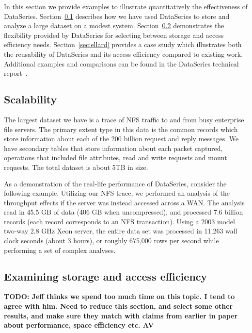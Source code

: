 \documentclass{acm_proc_article-sp}
\begin{document}
In this section we provide examples to illustrate quantitatively the 
effectiveness of DataSeries.  
Section~\ref{sec:scale} describes how we have used DataSeries to store 
and analyze a large dataset on a modest system.
Section~\ref{sec:efficiency} demonstrates the flexibility provided
by DataSeries for selecting between storage and access efficiency needs.
Section~\ref{sec:ellard} provides a case study which illustrates
both the reusability of DataSeries and its access efficiency compared
to existing work.
Additional examples and comparisons can be found in the
DataSeries technical report~\cite{DSTechnicalReportSnapshot}.

\subsection{Scalability}\label{sec:scale}

The largest dataset we have is a trace of NFS traffic to and from
busy enterprise file servers.
The primary extent type 
in this data is the common records which store information about each
of the 200 billion request and reply messages. We have secondary tables that
store information about each packet captured, operations that included
file attributes, read and write requests and mount requests.  The total dataset
is about 5TB in size.

As a demonstration of the real-life performance of
DataSeries, consider the following example.  Utilizing our NFS
trace, we performed an analysis of the throughput
effects if the server was instead accessed across a WAN.
The analysis read in 45.5 GB of data (406 GB when uncompressed), and
processed 7.6 billion records (each record corresponds to an NFS
transaction).  Using a 2003 model two-way 2.8 GHz Xeon server, the
entire data set was processed in 11,263 wall clock seconds (about 3
hours), or roughly 675,000 rows per second while performing a set of complex
analyses.



\subsection{Examining storage and access efficiency}\label{sec:efficiency}

{\bf TODO: Jeff thinks we spend too much time on this topic. I tend to 
agree with him. Need to reduce this section, and select some other results,
and make sure they match with claims from earlier in paper about performance,
space efficiency etc. AV }
\end{document}
